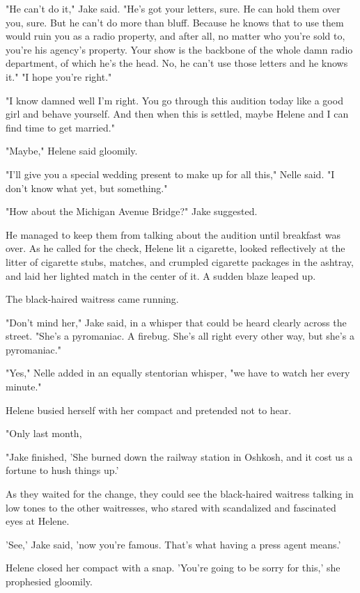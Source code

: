\documentclass{novel}
\begin{document}
"He can't do it," Jake said. "He's got your letters, sure. He can hold them over you, sure. But he can't do more than bluff. Because he knows that to use them would ruin you as a radio property, and after all, no matter who you're sold to, you're his agency's property. Your show is the backbone of the whole damn radio department, of which he's the head. No, he can't use those letters and he knows it." "I hope you're right."

"I know damned well I'm right. You go through this audition today like a good girl and behave yourself. And then when this is settled, maybe Helene and I can find time to get married."

"Maybe," Helene said gloomily.

"I'll give you a special wedding present to make up for all this," Nelle said. "I don't know what yet, but something."

"How about the Michigan Avenue Bridge?" Jake suggested.

He managed to keep them from talking about the audition until breakfast was over. As he called for the check, Helene lit a cigarette, looked reflectively at the litter of cigarette stubs, matches, and crumpled cigarette packages in the ashtray, and laid her lighted match in the center of it. A sudden blaze leaped up.

The black-haired waitress came running.

"Don't mind her," Jake said, in a whisper that could be heard clearly across the street. "She's a pyromaniac. A firebug. She's all right every other way, but she's a pyromaniac."

"Yes," Nelle added in an equally stentorian whisper, "we have to watch her every minute."

Helene busied herself with her compact and pretended not to hear.

"Only last month,

"Jake finished, 'She burned down the railway station in Oshkosh, and it cost us a fortune to hush things up.'

As they waited for the change, they could see the black-haired waitress talking in low tones to the other waitresses, who stared with scandalized and fascinated eyes at Helene.

'See,' Jake said, 'now you’re famous. That’s what having a press agent means.'

Helene closed her compact with a snap. 'You’re going to be sorry for this,' she prophesied gloomily.
\end{document}
